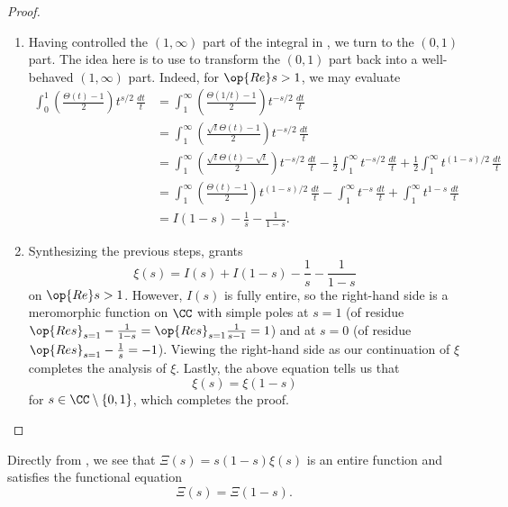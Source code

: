 \documentclass[../notes.tex]{subfiles}
\begin{document}
\begin{proof}
\begin{enumerate}
		\item Having controlled the $(1,\infty)$ part of the integral in , we turn to the $(0,1)$ part. The idea here is to use  to transform the $(0,1)$ part back into a well-behaved $(1,\infty)$ part. Indeed, for $\op{Re}s>1$, we may evaluate
		\begin{align*}
			\int_0^1\left(\frac{\Theta(t)-1}2\right)t^{s/2}\,\frac{dt}t &= \int_1^\infty\left(\frac{\Theta(1/t)-1}2\right)t^{-s/2}\,\frac{dt}t \\
			&= \int_1^\infty\left(\frac{\sqrt t\Theta(t)-1}2\right)t^{-s/2}\,\frac{dt}t \\
			&= \int_1^\infty\left(\frac{\sqrt t\Theta(t)-\sqrt t}2\right)t^{-s/2}\,\frac{dt}t-\frac12\int_1^\infty t^{-s/2}\,\frac{dt}t+\frac12\int_1^\infty t^{(1-s)/2}\,\frac{dt}t \\
			&= \int_1^\infty\left(\frac{\Theta(t)-1}2\right)t^{(1-s)/2}\,\frac{dt}t-\int_1^\infty t^{-s}\,\frac{dt}t+\int_1^\infty t^{1-s}\,\frac{dt}t \\
			&= I(1-s)-\frac1s-\frac1{1-s}.
		\end{align*}

		\item Synthesizing the previous steps,  grants
		\[\xi(s)=I(s)+I(1-s)-\frac1s-\frac1{1-s}\]
		on $\op{Re}s>1$. However, $I(s)$ is fully entire, so the right-hand side is a meromorphic function on $\CC$ with simple poles at $s=1$ (of residue $\op{Res}_{s=1}-\frac1{1-s}=\op{Res}_{s=1}\frac1{s-1}=1$) and at $s=0$ (of residue $\op{Res}_{s=1}-\frac1s=-1$). Viewing the right-hand side as our continuation of $\xi$ completes the analysis of $\xi$. Lastly, the above equation tells us that
		\[\xi(s)=\xi(1-s)\]
		for $s\in\CC\setminus\{0,1\}$, which completes the proof.
		\qedhere
	\end{enumerate}
\end{proof}
\begin{remark}
	Directly from , we see that $\Xi(s)=s(1-s)\xi(s)$ is an entire function and satisfies the functional equation
	\[\Xi(s)=\Xi(1-s).\]
\end{remark}
\end{document}
